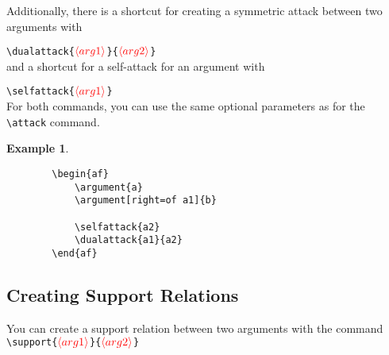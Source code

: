 \documentclass[headings=normal]{scrartcl}
\newcommand{\opt}[2][red]{\ensuremath{\textcolor{#1}{\langle #2\rangle}}}
\newtheorem{example}{Example}
\begin{document}
    Additionally, there is a shortcut for creating a symmetric attack between two arguments with

    \noindent
    \verb|\dualattack{|\opt{arg1}\verb|}{|\opt{arg2}\verb|}|\\

    \noindent
    and a shortcut for a self-attack for an argument with

    \noindent
    \verb|\selfattack{|\opt{arg1}\verb|}|\\

    \noindent
    For both commands, you can use the same optional parameters as for the \verb|\attack| command.

    \begin{example}~

    \begin{minipage}{0.4\textwidth}
        \begin{center}
        \begin{af}
    
        \end{af}
        \end{center}
    \end{minipage}%
    \begin{minipage}{0.5\textwidth}
        \begin{verbatim}
        \begin{af}
            \argument{a}
            \argument[right=of a1]{b}
    
            \selfattack{a2}
            \dualattack{a1}{a2}
        \end{af}  
        \end{verbatim}
    \end{minipage}
    \end{example}
    

\subsection{Creating Support Relations}
    You can create a support relation between two arguments with the command\\

    \noindent
    \verb|\support{|\opt{arg1}\verb|}{|\opt{arg2}\verb|}|
\end{document}

